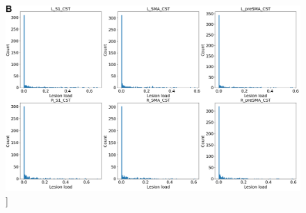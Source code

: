 \documentclass[phd,tocprelim]{cornell}
\renewcommand{\caption}[1]{\singlespacing\hangcaption{#1}\normalspacing}
\begin{document}
\null
\vfill
\clearpage
\null
\vfill
\begin{figure}[h!]
		\ContinuedFloat
		\captionsetup{labelformat=adja-page}
    \centering
    \includegraphics[width=1\textwidth]{chapter3/SupplementaryFig2c2.png}
    \caption[]{}
\end{figure}
\null
\vfill
\clearpage
\null
\vfill
\end{document}
